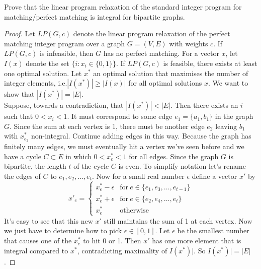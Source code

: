 \documentclass[12pt]{article}
\newenvironment{problem}[2][Problem]{\begin{trivlist}
\item[\hskip \labelsep {\bfseries #1}\hskip \labelsep {\bfseries #2.}]}{\end{trivlist}}
\theoremstyle{plain}
\begin{document}
\begin{problem}{3}
    Prove that the linear program relaxation of the standard integer program for matching/perfect matching is integral for bipartite graphs.
\end{problem}
\begin{proof}
    Let $LP(G,c)$ denote the linear program relaxation of the perfect matching integer program over a graph $G=(V,E)$ with weights $c$. If $LP(G,c)$ is infeasible, then $G$ has no perfect matching. For a vector $x$, let $I(x)$ denote the set $\{i:x_i\in\{0,1\}\}$. If $LP(G,c)$ is feasible, there exists at least one optimal solution. Let $x^*$ an optimal solution that maximises the number of integer elements, i.e.\@ $|I(x^*)| \geq |I(x)|$ for all optimal solutions $x$. We want to show that $|I(x^*)|=|E|$.\\
    \indent Suppose, towards a contradiction, that $|I(x^*)| < |E|$. Then there exists an $i$ such that $0<x_i<1$. It must correspond to some edge $e_1 = \{a_1, b_1\}$ in the graph $G$. Since the sum at each vertex is 1, there must be another edge $e_2$ leaving $b_1$ with $x^*_{e_2}$ non-integral. Continue adding edges in this way. Because the graph has finitely many edges, we must eventually hit a vertex we've seen before and we have a cycle $C\subset E$ in which $0< x^*_e <1$ for all edges. Since the graph $G$ is bipartite, the length $t$ of the cycle $C$ is even. To simplify notation let's rename the edges of $C$ to $e_1,e_2,\ldots,e_t$. Now for a small real number $\epsilon$ define a vector $x'$ by
    \[
        x'_e =
        \begin{cases}
            x^*_e - \epsilon & \text{for}\ e\in\{e_1,e_3,\ldots,e_{t-1}\}\\
            x^*_e + \epsilon & \text{for}\ e\in\{e_2,e_4,\ldots,e_t\}\\
            x^*_e & \text{otherwise}
        \end{cases}
    \]
    It's easy to see that this new $x'$ still maintains the sum of 1 at each vertex. Now we just have to determine how to pick $\epsilon\in[0,1]$. Let $\epsilon$ be the smallest number that causes one of the $x^*_e$ to hit 0 or 1. Then $x'$ has one more element that is integral compared to $x^*$, contradicting maximality of $I(x^*)|$. So $I(x^*)|=|E|$.
\end{proof}
\end{document}
